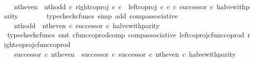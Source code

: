 \begin{isabellebody}
\ \ \ \ \isamarkupfalse%
\ \isamarkupfalse%
\ {\isachardoublequoteopen}{\isachardot}{\kern0pt}{\isachardot}{\kern0pt}{\isachardot}{\kern0pt}\ {\isacharequal}{\kern0pt}\ {\isacharparenleft}{\kern0pt}nth{\isacharunderscore}{\kern0pt}even\ {\isasymamalg}\ nth{\isacharunderscore}{\kern0pt}odd\ {\isasymcirc}\isactrlsub c\ right{\isacharunderscore}{\kern0pt}coproj\ {\isasymnat}\isactrlsub c\ {\isasymnat}\isactrlsub c\ {\isasymamalg}\ {\isacharparenleft}{\kern0pt}left{\isacharunderscore}{\kern0pt}coproj\ {\isasymnat}\isactrlsub c\ {\isasymnat}\isactrlsub c\ {\isasymcirc}\isactrlsub c\ successor{\isacharparenright}{\kern0pt}{\isacharparenright}{\kern0pt}\ {\isasymcirc}\isactrlsub c\ halve{\isacharunderscore}{\kern0pt}with{\isacharunderscore}{\kern0pt}parity{\isachardoublequoteclose}\isanewline
\ \ \ \ \ \ \isamarkupfalse%
\ {\isacharparenleft}{\kern0pt}typecheck{\isacharunderscore}{\kern0pt}cfuncs{\isacharcomma}{\kern0pt}\ simp\ add{\isacharcolon}{\kern0pt}\ comp{\isacharunderscore}{\kern0pt}associative{}{\isacharparenright}{\kern0pt}\isanewline
\ \ \ \ \isamarkupfalse%
\ \isamarkupfalse%
\ {\isachardoublequoteopen}{\isachardot}{\kern0pt}{\isachardot}{\kern0pt}{\isachardot}{\kern0pt}\ {\isacharequal}{\kern0pt}\ nth{\isacharunderscore}{\kern0pt}odd\ {\isasymamalg}\ {\isacharparenleft}{\kern0pt}nth{\isacharunderscore}{\kern0pt}even\ {\isasymcirc}\isactrlsub c\ successor{\isacharparenright}{\kern0pt}\ {\isasymcirc}\isactrlsub c\ halve{\isacharunderscore}{\kern0pt}with{\isacharunderscore}{\kern0pt}parity{\isachardoublequoteclose}\isanewline
\ \ \ \ \ \ \isamarkupfalse%
\ {\isacharparenleft}{\kern0pt}typecheck{\isacharunderscore}{\kern0pt}cfuncs{\isacharcomma}{\kern0pt}\ smt\ cfunc{\isacharunderscore}{\kern0pt}coprod{\isacharunderscore}{\kern0pt}comp\ comp{\isacharunderscore}{\kern0pt}associative{}\ left{\isacharunderscore}{\kern0pt}coproj{\isacharunderscore}{\kern0pt}cfunc{\isacharunderscore}{\kern0pt}coprod\ right{\isacharunderscore}{\kern0pt}coproj{\isacharunderscore}{\kern0pt}cfunc{\isacharunderscore}{\kern0pt}coprod{\isacharparenright}{\kern0pt}\isanewline
\ \ \ \ \isamarkupfalse%
\ \isamarkupfalse%
\ {\isachardoublequoteopen}{\isachardot}{\kern0pt}{\isachardot}{\kern0pt}{\isachardot}{\kern0pt}\ {\isacharequal}{\kern0pt}\ {\isacharparenleft}{\kern0pt}successor\ {\isasymcirc}\isactrlsub c\ nth{\isacharunderscore}{\kern0pt}even{\isacharparenright}{\kern0pt}\ {\isasymamalg}\ {\isacharparenleft}{\kern0pt}{\isacharparenleft}{\kern0pt}successor\ {\isasymcirc}\isactrlsub c\ successor{\isacharparenright}{\kern0pt}\ {\isasymcirc}\isactrlsub c\ nth{\isacharunderscore}{\kern0pt}even{\isacharparenright}{\kern0pt}\ {\isasymcirc}\isactrlsub c\ halve{\isacharunderscore}{\kern0pt}with{\isacharunderscore}{\kern0pt}parity{\isachardoublequoteclose}\isanewline

\end{isabellebody}
